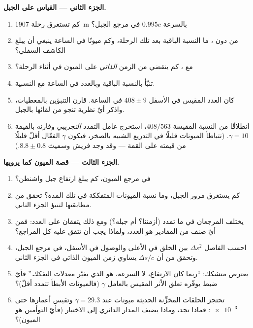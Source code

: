\begin{problem}
\medskip\noindent\textbf{الجزء الثاني --- القياس على الجبل.}
\begin{enumerate}[resume]
  \item كم تستغرق رحلة \qty{1907}{m} بالسرعة $0.995c$ في
        مرجع الجبل؟
  \item من دون ، ما النسبة الباقية بعد تلك الرحلة، وكم
        ميونًا في الساعة ينبغي أن يبلغ الكاشف السفلي؟
  \item مع ، كم ينقضي من الزمن \emph{الذاتي} على
        الميون في أثناء الرحلة؟
  \item تنبّأ بالنسبة الباقية وبالعدد في الساعة مع النسبية.
  \item كان العدد المقيس في الأسفل $408 \pm 9$ في الساعة. قارن
        التنبؤين بالمعطيات، واذكر أيّ نظرية
        تنجو من لقائها بالجبل.
  \item انطلاقًا من النسبة المقيسة $408/563$، استخرج عامل
        التمدد \emph{التجريبي} وقارنه بالقيمة
        $\gamma = 10$. (تتباطأ الميونات قليلًا في التدريع
        الشبيه بالصخر، فيكون $\gamma$ الفعّال أقلّ قليلًا من
        قيمته على القمة --- وقد وجد فريش وسميث $8.8 \pm
        0.8$.)
\end{enumerate}

\medskip\noindent\textbf{الجزء الثالث --- قصة الميون كما يرويها.}
\begin{enumerate}[resume]
  \item في مرجع الميون، كم يبلغ ارتفاع جبل واشنطن؟
  \item كم يستغرق مرور الجبل، وما نسبة الميونات المتفككة
        في تلك المدة؟ تحقق من مطابقتها لتنبؤ الجزء الثاني.
  \item يختلف المرجعان في ما تمدد (أزمننا؟ أم جبله؟) ومع ذلك
        يتفقان على العدد: فمن أيّ صنف من المقادير هو
        العدد، ولماذا يجب أن تتفق عليه كل المراجع؟
  \item احسب الفاصل $\Delta s^2$ بين الخلق في الأعلى
        والوصول في الأسفل، في مرجع الجبل، وتحقق
        من أن $\Delta s/c$ يساوي زمن الميون الذاتي في الجزء الثاني.
  \item يعترض متشكك: ``ربما كان الارتفاع، لا السرعة، هو الذي
        يغيّر معدلات التفكك.'' فأيّ ضبط يوفّره تعلق الأثر
        المقيس بالعامل $\gamma$ (فالميونات الأبطأ تتمدد أقلّ)؟
  \item تحتجز الحلقات المخزِّنة الحديثة ميونات عند $\gamma = 29.3$
        وتقيس أعمارها حتى $\num{e-3}$: فماذا تجد، وماذا
        يضيف المدار الدائري إلى الاختبار (فأيّ التوأمين هو
        الميون)؟
\end{enumerate}


\end{problem}
